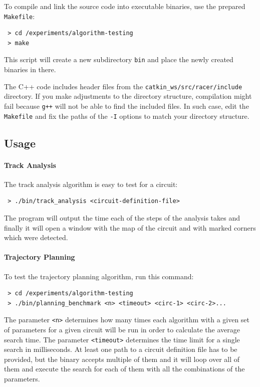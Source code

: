 To compile and link the source code into executable binaries, use the prepared \texttt{Makefile}:

\begin{verbatim}
 > cd /experiments/algorithm-testing
 > make
\end{verbatim}

This script will create a new subdirectory \texttt{bin} and place the newly created binaries in there.

The C++ code includes header files from the \texttt{catkin\_ws/src/racer/include} directory. If you make adjustments to the directory structure, compilation might fail because \texttt{g++} will not be able to find the included files. In such case, edit the \texttt{Makefile} and fix the paths of the \texttt{-I} options to match your directory structure.

\subsection{Usage}

\paragraph{Track Analysis}

The track analysis algorithm is easy to test for a circuit:

\begin{verbatim}
 > ./bin/track_analysis <circuit-definition-file>
\end{verbatim}

The program will output the time each of the steps of the analysis takes and finally it will open a window with the map of the circuit and with marked corners which were detected.

\paragraph{Trajectory Planning}
To test the trajectory planning algorithm, run this command:

\begin{verbatim}
 > cd /experiments/algorithm-testing
 > ./bin/planning_benchmark <n> <timeout> <circ-1> <circ-2>...
\end{verbatim}

The parameter \texttt{<n>} determines how many times each algorithm with a given set of parameters for a given circuit will be run in order to calculate the average search time. The parameter \texttt{<timeout>} determines the time limit for a single search in milliseconds. At least one path to a circuit definition file has to be provided, but the binary accepts multiple of them and it will loop over all of them and execute the search for each of them with all the combinations of the parameters.

